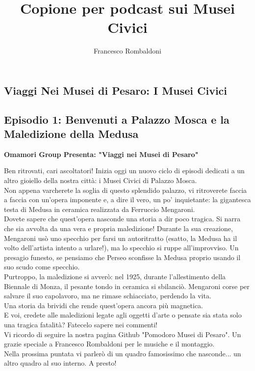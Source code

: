 \documentclass[hidelinks,12pt,a4paper]{article}
\begin{document}
	\begin{flushleft}
		
		\LARGE
		
		\title{\textbf{Copione per podcast sui Musei Civici}}
		\author{Francesco Rombaldoni}
		\date{}
		
		\maketitle
		
		\setcounter{page}{1}
		\newpage
		
		\tableofcontents
		\newpage
		
		\section{Viaggi Nei Musei di Pesaro: I Musei Civici}
		
		\subsection{Episodio 1: Benvenuti a Palazzo Mosca e la Maledizione della Medusa}
		\begin{center}
			\textbf{Omamori Group Presenta: "Viaggi nei Musei di Pesaro"}
		\end{center}
		Ben ritrovati, cari ascoltatori! Inizia oggi un nuovo ciclo di episodi dedicati a un altro gioiello della nostra città: i Musei Civici di Palazzo Mosca.\\
		Non appena varcherete la soglia di questo splendido palazzo, vi ritroverete faccia a faccia con un'opera imponente e, a dire il vero, un po' inquietante: la gigantesca testa di Medusa in ceramica realizzata da Ferruccio Mengaroni.\\
		Dovete sapere che quest'opera nasconde una storia a dir poco tragica. Si narra che sia avvolta da una vera e propria maledizione! Durante la sua creazione, Mengaroni usò uno specchio per farsi un autoritratto (esatto, la Medusa ha il volto dell'artista intento a urlare!), ma lo specchio si ruppe all'improvviso. Un presagio funesto, se pensiamo che Perseo sconfisse la Medusa proprio usando il suo scudo come specchio.\\
		Purtroppo, la maledizione si avverò: nel 1925, durante l'allestimento della Biennale di Monza, il pesante tondo in ceramica si sbilanciò. Mengaroni corse per salvare il suo capolavoro, ma ne rimase schiacciato, perdendo la vita.\\
		Una storia da brividi che rende quest'opera ancora più magnetica.\\
		E voi, credete alle maledizioni legate agli oggetti d'arte o pensate sia stata solo una tragica fatalità? Fatecelo sapere nei commenti!\\
		Vi ricordo di seguire la nostra pagina Github "Pomodoro Musei di Pesaro". Un grazie speciale a Francesco Rombaldoni per le musiche e il montaggio.\\
		Nella prossima puntata vi parlerò di un quadro famosissimo che nasconde... un altro quadro al suo interno. A presto!\\
		

\end{flushleft}
\end{document}
